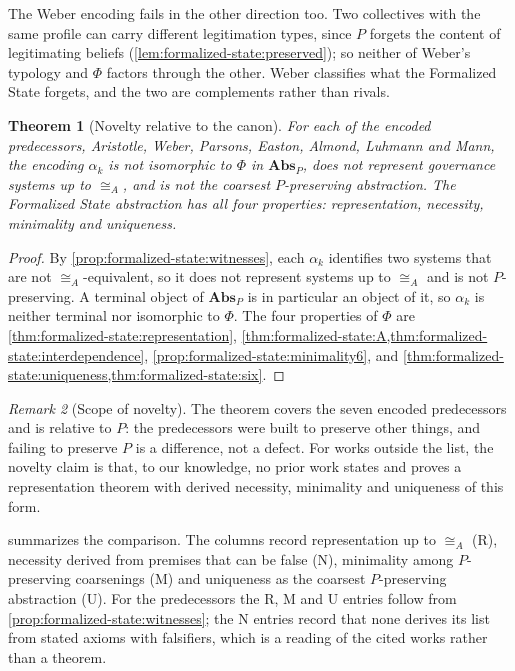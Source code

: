 \documentclass[11pt,letterpaper]{article}
\newtheorem{theorem}{Theorem}[section]
\theoremstyle{definition}
\theoremstyle{remark}
\newtheorem{remark}[theorem]{Remark}
\begin{document}
The Weber encoding fails in the other direction too. Two collectives with the same profile can carry different legitimation types, since $P$ forgets the content of legitimating beliefs (\cref{lem:formalized-state:preserved}); so neither of Weber's typology and $\Phi$ factors through the other. Weber classifies what the Formalized State forgets, and the two are complements rather than rivals.

\begin{theorem}[Novelty relative to the canon]
\label{thm:formalized-state:novelty}
For each of the encoded predecessors, Aristotle, Weber, Parsons, Easton, Almond, Luhmann and Mann, the encoding $\alpha_k$ is not isomorphic to $\Phi$ in $\mathbf{Abs}_P$, does not represent governance systems up to $\cong_A$, and is not the coarsest $P$-preserving abstraction. The Formalized State abstraction has all four properties: representation, necessity, minimality and uniqueness.
\end{theorem}

\begin{proof}
By \cref{prop:formalized-state:witnesses}, each $\alpha_k$ identifies two systems that are not $\cong_A$-equivalent, so it does not represent systems up to $\cong_A$ and is not $P$-preserving. A terminal object of $\mathbf{Abs}_P$ is in particular an object of it, so $\alpha_k$ is neither terminal nor isomorphic to $\Phi$. The four properties of $\Phi$ are \cref{thm:formalized-state:representation}, \cref{thm:formalized-state:A,thm:formalized-state:interdependence}, \cref{prop:formalized-state:minimality6}, and \cref{thm:formalized-state:uniqueness,thm:formalized-state:six}.
\end{proof}

\begin{remark}[Scope of novelty]
\label{rem:formalized-state:novelty-scope}
The theorem covers the seven encoded predecessors and is relative to $P$: the predecessors were built to preserve other things, and failing to preserve $P$ is a difference, not a defect. For works outside the list, the novelty claim is that, to our knowledge, no prior work states and proves a representation theorem with derived necessity, minimality and uniqueness of this form.
\end{remark}

 summarizes the comparison. The columns record representation up to $\cong_A$ (R), necessity derived from premises that can be false (N), minimality among $P$-preserving coarsenings (M) and uniqueness as the coarsest $P$-preserving abstraction (U). For the predecessors the R, M and U entries follow from \cref{prop:formalized-state:witnesses}; the N entries record that none derives its list from stated axioms with falsifiers, which is a reading of the cited works rather than a theorem.
\end{document}
